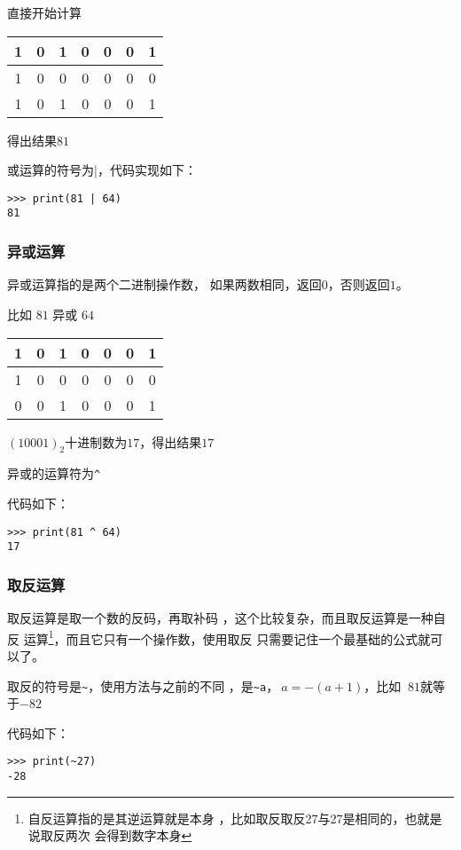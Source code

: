 \documentclass{book}
\begin{document}
直接开始计算\\
\begin{tabular}{|c|c|c|c|c|c|c|}
\hline
1 & 0 & 1 & 0 & 0 & 0 & 1\\\hline
1 & 0 & 0 & 0 & 0 & 0 & 0\\\hline
1 & 0 & 1 & 0 & 0 & 0 & 1\\\hline
\end{tabular}


得出结果$81$


或运算的符号为|，代码实现如下：

\begin{verbatim}
>>> print(81 | 64)
81
\end{verbatim}

\subsubsection{异或运算}


\indent 异或运算指的是两个二进制操作数，
如果两数相同，返回$0$，否则返回$1$。


比如 $81$ 异或 $64$\\

\begin{tabular}{|c|c|c|c|c|c|c|}
\hline
1 & 0 & 1 & 0 & 0 & 0 & 1\\\hline
1 & 0 & 0 & 0 & 0 & 0 & 0\\\hline
0 & 0 & 1 & 0 & 0 & 0 & 1\\\hline
\end{tabular}


$(10001)_2$十进制数为$17$，得出结果$17$


异或的运算符为\verb|^|


代码如下：
\begin{verbatim}
>>> print(81 ^ 64)
17
\end{verbatim}


\subsubsection{取反运算}
\indent 取反运算是取一个数的反码，再取补码
，这个比较复杂，而且取反运算是一种自反
运算\footnote{自反运算指的是其逆运算就是本身
，比如取反取反27与27是相同的，也就是说取反两次
会得到数字本身}，而且它只有一个操作数，使用取反
只需要记住一个最基础的公式就可以了。


取反的符号是\verb|~|，使用方法与之前的不同
，是\verb|~a|，$~a = -(a+1)$，比如
$~81$就等于$-82$


代码如下：
\begin{verbatim}
>>> print(~27)
-28
\end{verbatim}
\end{document}
